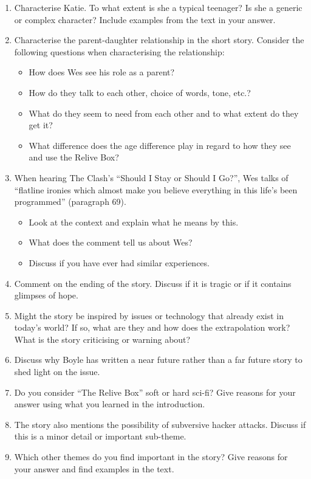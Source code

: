 \documentclass[10pt,a4paper,table]{article}
\newcommand{\qm}[1]{``#1''}
\begin{document}
\begin{enumerate}
  \item Characterise Katie. To what extent is she a typical teenager? Is she a generic or complex character? Include examples from the text in your answer.

  \item Characterise the parent-daughter relationship in the short story. Consider the following questions when characterising the relationship:
    \begin{itemize}
      \item How does Wes see his role as a parent?
      \item How do they talk to each other, choice of words, tone, etc.?
      \item What do they seem to need from each other and to what extent do they get it?
      \item What difference does the age difference play in regard to how they see and use the Relive Box?
    \end{itemize}

  \item When hearing The Clash's \qm{Should I Stay or Should I Go?}, Wes talks of \qm{flatline ironies which almost make you believe everything in this life's been programmed} (paragraph 69).
    \begin{itemize}
      \item Look at the context and explain what he means by this.
      \item What does the comment tell us about Wes?
      \item Discuss if you have ever had similar experiences.
    \end{itemize}

  \item Comment on the ending of the story. Discuss if it is tragic or if it contains glimpses of hope.

  \item Might the story be inspired by issues or technology that already exist in today's world? If so, what are they and how does the extrapolation work? What is the story criticising or warning about?

  \item Discuss why Boyle has written a near future rather than a far future story to shed light on the issue.

  \item Do you consider \qm{The Relive Box} soft or hard sci-fi? Give reasons for your answer using what you learned in the introduction.

  \item The story also mentions the possibility of subversive hacker attacks. Discuss if this is a minor detail or important sub-theme.

  \item Which other themes do you find important in the story? Give reasons for your answer and find examples in the text.
\end{enumerate}
\end{document}
